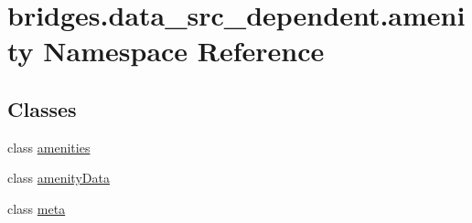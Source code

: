 \hypertarget{namespacebridges_1_1data__src__dependent_1_1amenity}{}\section{bridges.\+data\+\_\+src\+\_\+dependent.\+amenity Namespace Reference}
\label{namespacebridges_1_1data__src__dependent_1_1amenity}
\subsection*{Classes}
\begin{DoxyCompactItemize}
\item 
class \hyperlink{classbridges_1_1data__src__dependent_1_1amenity_1_1amenities}{amenities}
\item 
class \hyperlink{classbridges_1_1data__src__dependent_1_1amenity_1_1amenity_data}{amenity\+Data}
\item 
class \hyperlink{classbridges_1_1data__src__dependent_1_1amenity_1_1meta}{meta}
\end{DoxyCompactItemize}
